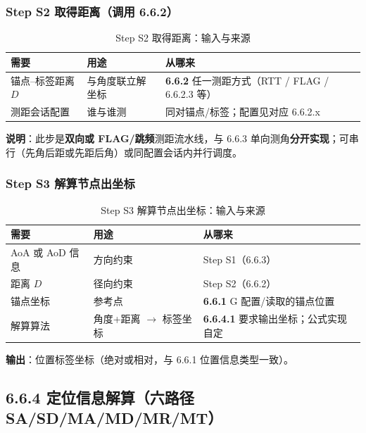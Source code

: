 \documentclass[11pt,a4paper]{ctexart}
\begin{document}
\subsubsection{Step S2 取得距离（调用 6.6.2）}

\begin{longtable}{L{3.2cm}L{5.0cm}L{4.8cm}}
\caption{Step S2 取得距离：输入与来源\label{tab:step121}} \\
\toprule
\textbf{需要} & \textbf{用途} & \textbf{从哪来} \\
\midrule
锚点--标签距离 $D$ & 与角度联立解坐标 & \textbf{6.6.2} 任一测距方式（RTT / FLAG / 6.6.2.3 等） \\
测距会话配置 & 谁与谁测 & 同对锚点/标签；配置见对应 6.6.2.x \\
\bottomrule
\end{longtable}

\textbf{说明}：此步是\textbf{双向或 FLAG/跳频}测距流水线，与 6.6.3 单向测角\textbf{分开实现}；可串行（先角后距或先距后角）或同配置会话内并行调度。

\subsubsection{Step S3 解算节点出坐标}

\begin{longtable}{L{3.2cm}L{5.0cm}L{4.8cm}}
\caption{Step S3 解算节点出坐标：输入与来源\label{tab:step122}} \\
\toprule
\textbf{需要} & \textbf{用途} & \textbf{从哪来} \\
\midrule
AoA 或 AoD 信息 & 方向约束 & Step S1（6.6.3） \\
距离 $D$ & 径向约束 & Step S2（6.6.2） \\
锚点坐标 & 参考点 & \textbf{6.6.1} G 配置/读取的锚点位置 \\
解算算法 & 角度+距离 $\rightarrow$ 标签坐标 & \textbf{6.6.4.1} 要求输出坐标；公式实现自定 \\
\bottomrule
\end{longtable}

\textbf{输出}：位置标签坐标（绝对或相对，与 6.6.1 位置信息类型一致）。



\subsection{6.6.4 定位信息解算（六路径 SA/SD/MA/MD/MR/MT）}
\end{document}
